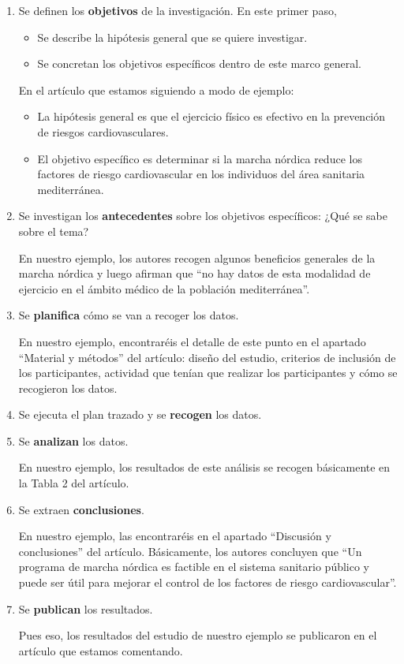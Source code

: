 \documentclass[
]{book}
\providecommand{\tightlist}{%
  \setlength{\itemsep}{0pt}\setlength{\parskip}{0pt}}
\theoremstyle{definition}
\theoremstyle{definition}
\theoremstyle{definition}
\theoremstyle{definition}
\theoremstyle{remark}
\begin{document}
\begin{enumerate}
\def\labelenumi{\arabic{enumi}.}
\item
  Se definen los \textbf{objetivos} de la investigación. En este primer paso,

  \begin{itemize}
  \tightlist
  \item
    Se describe la hipótesis general que se quiere investigar.
  \item
    Se concretan los objetivos específicos dentro de este marco general.
  \end{itemize}

  En el artículo que estamos siguiendo a modo de ejemplo:

  \begin{itemize}
  \tightlist
  \item
    La hipótesis general es que el ejercicio físico es efectivo en la prevención de riesgos cardiovasculares.
  \item
    El objetivo específico es determinar si la marcha nórdica reduce los factores de riesgo cardiovascular en los individuos del área sanitaria mediterránea.
  \end{itemize}
\item
  Se investigan los \textbf{antecedentes} sobre los objetivos específicos: ¿Qué se sabe sobre el tema?

  En nuestro ejemplo, los autores recogen algunos beneficios generales de la marcha nórdica y luego afirman que ``no hay datos de esta modalidad de ejercicio en el ámbito médico de la población mediterránea''.
\item
  Se \textbf{planifica} cómo se van a recoger los datos.

  En nuestro ejemplo, encontraréis el detalle de este punto en el apartado ``Material y métodos'' del artículo: diseño del estudio, criterios de inclusión de los participantes, actividad que tenían que realizar los participantes y cómo se recogieron los datos.
\item
  Se ejecuta el plan trazado y se \textbf{recogen} los datos.
\item
  Se \textbf{analizan} los datos.

  En nuestro ejemplo, los resultados de este análisis se recogen básicamente en la Tabla 2 del artículo.
\item
  Se extraen \textbf{conclusiones}.

  En nuestro ejemplo, las encontraréis en el apartado ``Discusión y conclusiones'' del artículo. Básicamente, los autores concluyen que ``Un programa de marcha nórdica es factible en el sistema sanitario público y puede ser útil para mejorar el control de los factores de riesgo cardiovascular''.
\item
  Se \textbf{publican} los resultados.

  Pues eso, los resultados del estudio de nuestro ejemplo se publicaron en el artículo que estamos comentando.
\end{enumerate}
\end{document}
